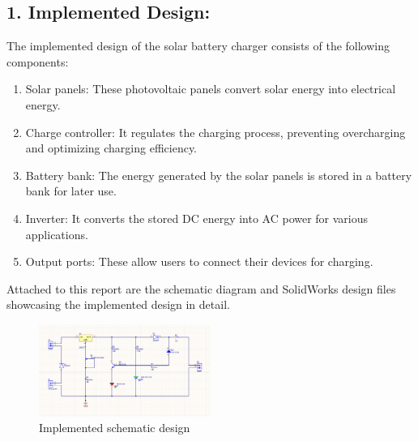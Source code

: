 \documentclass[twocolumn]{article}
\begin{document}
\subsection*{1. Implemented Design:}

\noindent The implemented design of the solar battery charger consists of the following components:

\begin{enumerate}

    \item Solar panels: These photovoltaic panels convert solar energy into electrical energy.
    \item Charge controller: It regulates the charging process, preventing overcharging and optimizing charging efficiency.
    
    \item Battery bank: The energy generated by the solar panels is stored in a battery bank for later use.
    
    \item Inverter: It converts the stored DC energy into AC power for various applications.
    \item Output ports: These allow users to connect their devices for charging.
    
\end{enumerate}

\noindent Attached to this report are the schematic diagram and SolidWorks design files showcasing the implemented design in detail.

\begin{figure}[h]
\centering
\includegraphics[width=0.5\textwidth]{5.png}
\caption{Implemented schematic design}
\end{figure}
\end{document}
